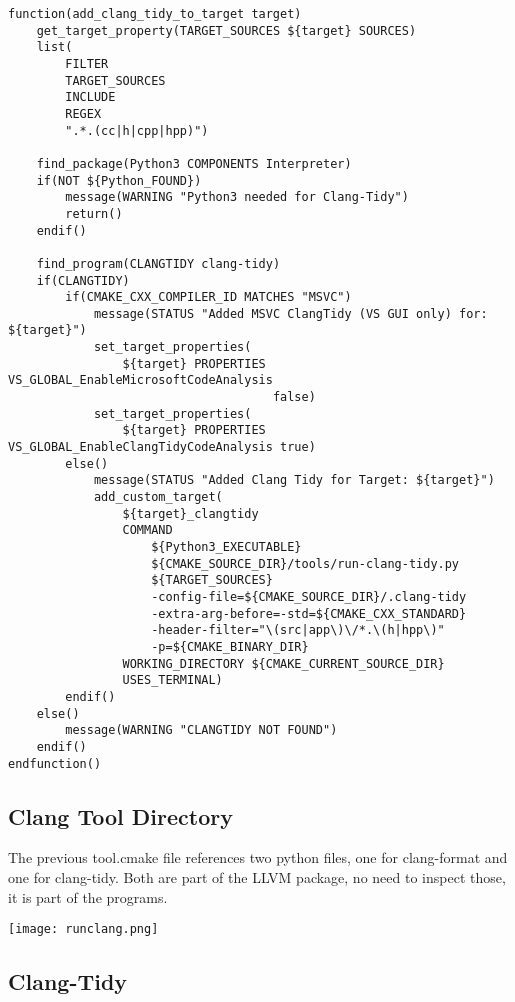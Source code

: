 \begin{verbatim}
function(add_clang_tidy_to_target target)
    get_target_property(TARGET_SOURCES ${target} SOURCES)
    list(
        FILTER
        TARGET_SOURCES
        INCLUDE
        REGEX
        ".*.(cc|h|cpp|hpp)")

    find_package(Python3 COMPONENTS Interpreter)
    if(NOT ${Python_FOUND})
        message(WARNING "Python3 needed for Clang-Tidy")
        return()
    endif()

    find_program(CLANGTIDY clang-tidy)
    if(CLANGTIDY)
        if(CMAKE_CXX_COMPILER_ID MATCHES "MSVC")
            message(STATUS "Added MSVC ClangTidy (VS GUI only) for: ${target}")
            set_target_properties(
                ${target} PROPERTIES VS_GLOBAL_EnableMicrosoftCodeAnalysis
                                     false)
            set_target_properties(
                ${target} PROPERTIES VS_GLOBAL_EnableClangTidyCodeAnalysis true)
        else()
            message(STATUS "Added Clang Tidy for Target: ${target}")
            add_custom_target(
                ${target}_clangtidy
                COMMAND
                    ${Python3_EXECUTABLE}
                    ${CMAKE_SOURCE_DIR}/tools/run-clang-tidy.py
                    ${TARGET_SOURCES}
                    -config-file=${CMAKE_SOURCE_DIR}/.clang-tidy
                    -extra-arg-before=-std=${CMAKE_CXX_STANDARD}
                    -header-filter="\(src|app\)\/*.\(h|hpp\)"
                    -p=${CMAKE_BINARY_DIR}
                WORKING_DIRECTORY ${CMAKE_CURRENT_SOURCE_DIR}
                USES_TERMINAL)
        endif()
    else()
        message(WARNING "CLANGTIDY NOT FOUND")
    endif()
endfunction()
\end{verbatim}


\subsection{Clang Tool Directory}

The previous tool.cmake file references two python files, one for clang-format and one for clang-tidy.
Both are part of the LLVM package, no need to inspect those, it is part of the programs.

\begin{center}
    \texttt{[image: runclang.png]}
\end{center}

\subsection{Clang-Tidy}

